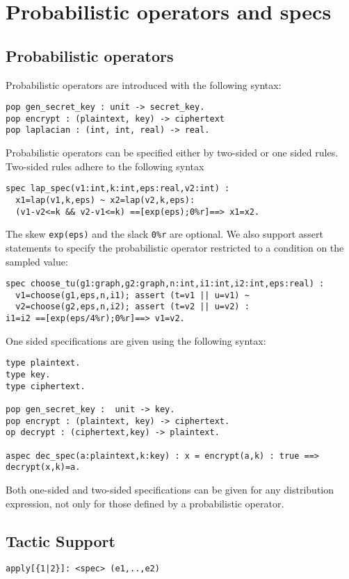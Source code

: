 \documentclass[a4paper,notitlepage]{book}
\begin{document}
  \section{Probabilistic operators and specs}



\subsection{Probabilistic operators}
Probabilistic operators are introduced with the following syntax:
\begin{verbatim}
pop gen_secret_key : unit -> secret_key.
pop encrypt : (plaintext, key) -> ciphertext
pop laplacian : (int, int, real) -> real.
\end{verbatim}

Probabilistic operators can be specified either by two-sided or one
sided rules. Two-sided rules adhere to the following syntax
\begin{verbatim}
spec lap_spec(v1:int,k:int,eps:real,v2:int) :
  x1=lap(v1,k,eps) ~ x2=lap(v2,k,eps):
  (v1-v2<=k && v2-v1<=k) ==[exp(eps);0%r]==> x1=x2.
\end{verbatim}
The skew \verb|exp(eps)| and the slack \verb|0%r| are optional.
We also support assert statements to specify the probabilistic
operator restricted to a condition on the sampled value:
\begin{verbatim}
spec choose_tu(g1:graph,g2:graph,n:int,i1:int,i2:int,eps:real) : 
  v1=choose(g1,eps,n,i1); assert (t=v1 || u=v1) ~ 
  v2=choose(g2,eps,n,i2); assert (t=v2 || u=v2) :
i1=i2 ==[exp(eps/4%r);0%r]==> v1=v2.
\end{verbatim}

One sided specifications are given using the following syntax:
\begin{verbatim}
type plaintext.
type key.
type ciphertext.

pop gen_secret_key :  unit -> key.
pop encrypt : (plaintext, key) -> ciphertext.
op decrypt : (ciphertext,key) -> plaintext.

aspec dec_spec(a:plaintext,k:key) : x = encrypt(a,k) : true ==> decrypt(x,k)=a.
\end{verbatim}

Both one-sided and two-sided specifications can be given for any
distribution expression, not only for those defined by a probabilistic
operator.


  \subsection{Tactic Support}
  \verb+apply[{1|2}]: <spec> (e1,..,e2)+
\end{document}
